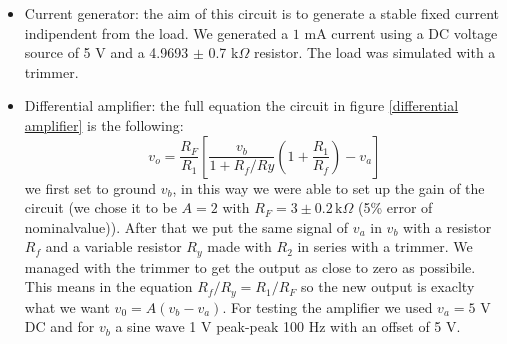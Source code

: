 \begin{itemize}
\item Current generator: the aim of this circuit is to generate a stable fixed current indipendent from the load. We generated a $1$ mA current using a DC voltage source of 5 V and a 4.9693 $\pm$ 0.7 k$\Omega$ resistor. The load was simulated with a trimmer. 
\item Differential amplifier: the full equation the circuit in figure \eqref{differential amplifier} is the following:
\[v_o = \frac{R_F}{R_1}\left[\frac{v_b}{1+R_f/Ry}\left(1+\frac{R_1}{R_f}\right)-v_a\right]\]
we first set to ground $v_b$, in this way we were able to set up the gain of the circuit (we chose it to be $A=2$ with $R_F =3\pm 0.2\, \text{k}\Omega$ (5\% error of nominalvalue)). After that we put the same signal of $v_a$ in $v_b$ with a resistor $R_f$ and a variable resistor $R_y$ made with $R_2$ in series with a trimmer. We managed with the trimmer to get the output as close to zero as possibile. This means in the equation $R_f/R_y = R_1/R_F$ so the new output is exaclty what we want $v_0 = A(v_b-v_a)$. For testing the amplifier we used $v_a= 5$ V DC and for $v_b$ a sine wave 1 V peak-peak 100 Hz with an offset of 5 V.
\end{itemize}

